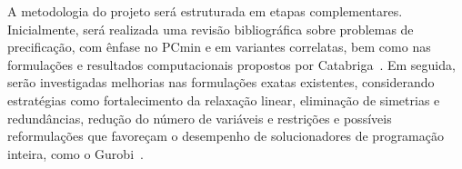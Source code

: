 





A metodologia do projeto será estruturada em etapas complementares. Inicialmente, será realizada uma revisão bibliográfica sobre problemas de precificação, com ênfase no PCmin e em variantes correlatas, bem como nas formulações e resultados computacionais propostos por Catabriga~\cite{catabriga2025}. Em seguida, serão investigadas melhorias nas formulações exatas existentes, considerando estratégias como fortalecimento da relaxação linear, eliminação de simetrias e redundâncias, redução do número de variáveis e restrições e possíveis reformulações que favoreçam o desempenho de solucionadores de programação inteira, como o Gurobi~\cite{gurobi}.

